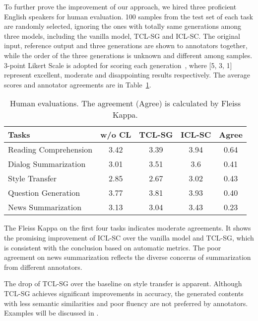 To further prove the improvement of our approach, we hired three proficient English speakers for human evaluation. 100 samples from the test set of each task are randomly selected, ignoring the ones with totally same generations among three models, including the vanilla model, TCL-SG and ICL-SC. The original input, reference output and three generations are shown to annotators together, while the order of the three generations is unknown and different among samples. 3-point Likert Scale is adopted for scoring each generation~\cite{gliwa2019samsum}, where [5, 3, 1] represent 
excellent, moderate and disappointing results 
respectively. The average scores and annotator agreements 
are in 
Table~\ref{tab:humaneval}.
\begin{table}[h]
	\scriptsize
	\centering
	\begin{tabular}{l|ccc|c}
		\hline
		{Tasks} & {w/o CL} & {TCL-SG} & {ICL-SC} & {Agree}  \\
		\hline
		Reading Comprehension  &3.42 & 3.39 &3.94 &0.64 \\
		Dialog Summarization &3.01 &3.51 &3.6 &0.41 \\
		Style Transfer &2.85 &2.67 & 3.02&0.43 \\
		Question Generation &3.77 & 3.81 &3.93 &0.40 \\
		News Summarization & 3.13 &3.04 &3.43 &0.23 \\
		\hline
	\end{tabular}
	\caption{Human evaluations. The agreement (Agree) is calculated by Fleiss Kappa.}
	\label{tab:humaneval}
\end{table}

The Fleiss Kappa on the first four tasks indicates moderate agreements. It shows the promising improvement of ICL-SC over the vanilla model and TCL-SG, which is consistent with the conclusion based on automatic metrics. The poor agreement on news summarization reflects the 
diverse concerns of summarization from different 
annotators. 

The drop of TCL-SG over the baseline on style transfer is apparent. Although TCL-SG achieves significant improvements in accuracy, the generated contents with less semantic similarities and poor fluency are not preferred by annotators. Examples will be discussed in .



